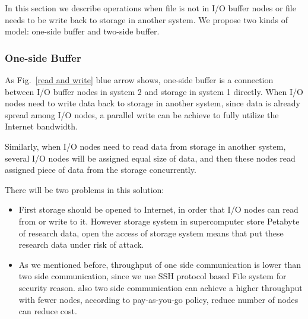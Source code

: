 \documentclass[JIP,draft]{ipsj}
\begin{document}
In this section we describe operations when file is not in I/O buffer nodes or file needs to be write back to storage in another system.
We propose two kinds of model: one-side buffer and two-side buffer.

\subsubsection{One-side Buffer}

As Fig.~\ref{read and write} blue arrow shows, one-side buffer is a connection between I/O buffer nodes in system 2 and storage in system 1 directly.
When I/O nodes need to write data back to storage in another system, since data is already spread among I/O nodes, a parallel write can be achieve to fully utilize the Internet bandwidth.

Similarly, when I/O nodes need to read data from storage in another system, several I/O nodes will be assigned equal size of data, and then these nodes read assigned piece of data from the storage concurrently.

There will be two problems in this solution:
\begin{itemize}
	\item First storage should be opened to Internet, in order that I/O nodes can read from or write to it.
		However storage system in supercomputer store Petabyte of research data, open the access of storage system means that put these research data under risk of attack.
	\item As we mentioned before, throughput of one side communication is lower than two side communication, since we use SSH protocol based File system for security reason.
		also two side communication can achieve a higher throughput with fewer nodes, according to pay-as-you-go policy, reduce number of nodes can reduce cost.
\end{itemize}

\end{document}
